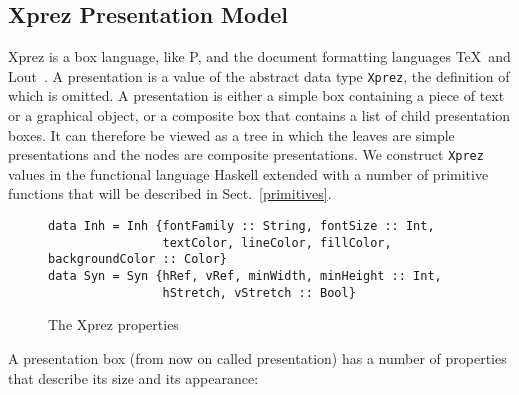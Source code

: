 %									
\subsection{{\sc Xprez} Presentation Model}

{\sc Xprez} is a box language, like P, and the document formatting languages \TeX ~and Lout~\cite{lout}. A presentation is a value of the abstract data type \texttt{Xprez}, the definition of which is omitted. A presentation is either a simple box containing a piece of text or a graphical object, or a composite box that contains a list of child presentation boxes. It can therefore be viewed as a tree in which the leaves are simple presentations and the nodes are composite presentations. We construct \texttt{Xprez} values in the functional language Haskell extended with a number of primitive functions that will be described in Sect.~\ref{primitives}.

\begin{figure}
\begin{small}
\begin{center}
\begin{small}
\begin{verbatim}
data Inh = Inh {fontFamily :: String, fontSize :: Int,
                textColor, lineColor, fillColor, backgroundColor :: Color} 
data Syn = Syn {hRef, vRef, minWidth, minHeight :: Int,
                hStretch, vStretch :: Bool}
\end{verbatim}
\end{small}
\caption{The {\sc Xprez} properties}\label{xprezproperties} 
\end{center}
\end{small}
\end{figure}
\pagebreak

A presentation box (from now on called presentation) has a number of properties that describe its size and its appearance: 

\begin{center}
\end{center}

